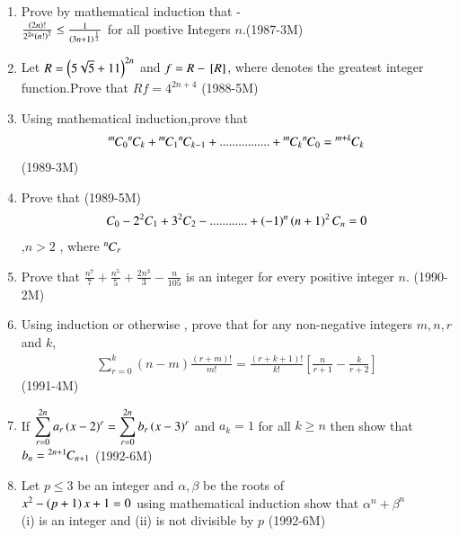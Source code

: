 \documentclass[journal,12pt,twocolumn]{IEEEtran}
\theoremstyle{remark}
\begin{document}
\begin{enumerate}
	    \item Prove by mathematical induction that -\\
		    $ \frac{\left(2n\right)!}{2^{2n}\left(n!\right)^2}\leq \frac{1}{\left(3n+1\right)^{\frac{1}{2}}} $  for all postive Integers $n$.\hfill {(1987-3M)}


	    \item Let $ R =\left(5\sqrt{5}+11\right)^{2n} $ and $ f = R -{}\left[R\right] $, where \sbrak{} denotes the greatest integer function.Prove  that $ Rf =4^{2n+4 } $  \hfill {(1988-5M)}


	    \item Using mathematical induction,prove that
		    \begin{align*} {{}^{m}\mkern-1muC_{0}}{{}^{n}\mkern-1muC_{k}} +{{}^{m}\mkern-1muC_{1}}{{}^{n}\mkern-1muC_{k-1}}+................+{{}^{m}\mkern-1muC_{k}}{{}^{n}\mkern-1muC_{0}} ={{}^{m+k}\mkern-1muC_{k}} \end{align*}  \hfill{(1989-3M)}


	    \item Prove that \hfill{(1989-5M)}
		    \begin{align*} 
		    C_0-2^2C_1+3^2C_2-............+\left(-1\right)^n\left(n+1\right)^2C_n =0
		    \end{align*},$n>2$ , where ${{}^{n}\mkern-1muC_{r}}$
		    

	    \item Prove that   $ \frac{n^7}{7}+\frac{n^5}{5}+\frac{2n^3}{3}-\frac{n}{105}$ is an integer for every positive integer $ n$. \hfill{(1990-2M)}


	    \item Using induction or otherwise , prove that for any non-negative integers $m,n,r$ and $ k$,
		    \begin{align*} 
			    \sum_{r=0}^{k}(n-m)\frac{(r+m)!}{m!}= \frac{(r+k+1)!}{k!}[\frac{n}{r+1}-\frac{k}{r+2}]
		    \end{align*}
		     \hfill{(1991-4M)} 

	     \item If $ \displaystyle\sum_{r=0}^{2n} a_r \left(x-2\right)^r=\displaystyle\sum_{r=0}^{2n}b_r \left(x-3\right)^r $ and $ a_k =1 $ for all $k \geq  n$ then show that $ b_n = {{}^{2n+1}\mkern-1muC_{n+1}} $ \hfill{(1992-6M)}

	    \item Let $ p \leq 3 $ be an integer and $ \alpha , \beta $ be  the roots of\\ $ x^2-\left(p+1\right)x+1=0 $ using mathematical induction show that $ \alpha^n  + \beta^n $\\ (i) is an integer and   
		    (ii) is not divisible by $ p $       \hfill{(1992-6M)}
		    
 \end{enumerate}
    
    
\end{document}
